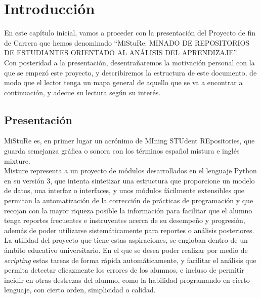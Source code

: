 \chapter{Introducción}
\label{sec:intro}

En este capítulo inicial, vamos a proceder con la presentación del Proyecto de fin de Carrera que hemos denominado “MiStuRe: MINADO DE REPOSITORIOS DE ESTUDIANTES ORIENTADO AL ANÁLISIS DEL APRENDIZAJE”.\\


Con posteridad a la presentación, desentrañaremos la motivación personal con la que se empezó este proyecto, y describiremos la estructura de este documento, de modo que el lector tenga un mapa general de aquello que se va a encontrar a continuación, y adecue su lectura según su interés.


\newpage

\section{Presentación}

MiStuRe es, en primer lugar un acrónimo de MIning STUdent REpositories, que guarda semejanza gráfica o sonora con los términos español mistura e inglés mixture.\\


Misture representa a un proyecto de módulos desarrollados en el lenguaje Python en su versión 3, que intenta sintetizar una estructura que proporcione un modelo de datos, una interfaz o interfaces, y unos módulos fácilmente extensibles que permitan la automatización de la corrección de prácticas de programación y que recojan con la mayor riqueza posible la información para facilitar que el alumno tenga reportes frecuentes e instruyentes acerca de su desempeño y progresión, además de poder utilizarse sistemáticamente para reportes o análisis posteriores.\\


La utilidad del proyecto que tiene estas aspiraciones, se engloban dentro de un ámbito educativo universitario. En el que se desea poder realizar por medio de \textit{scripting} estas tareas de forma rápida automáticamente, y facilitar el análisis que permita detectar eficazmente los errores de los alumnos, e incluso de permitir incidir en otras destrezas del alumno, como la habilidad programando en cierto lenguaje, con cierto orden, simplicidad o calidad.\\


